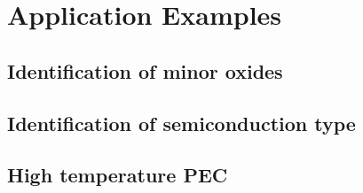 \section{Application Examples}

\subsection{Identification of minor oxides}
\subsection{Identification of semiconduction type}
\subsection{High temperature PEC}